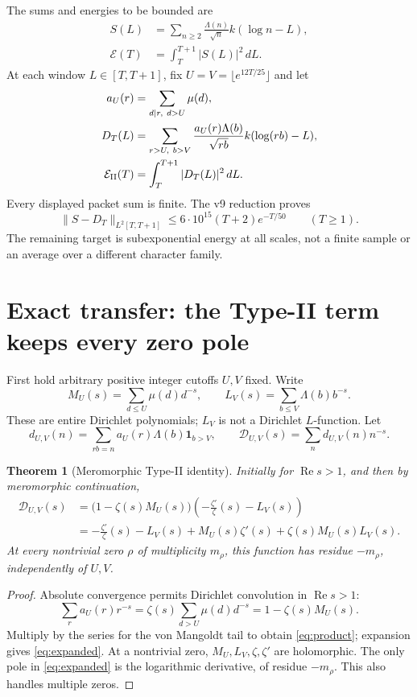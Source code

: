 \documentclass[11pt]{article}
\newtheorem{theorem}{Theorem}
\newcommand{\dd}{\,d}
\newcommand{\Ree}{\operatorname{Re}}
\newcommand{\E}{\mathcal E}
\newcommand{\D}{\mathcal D}
\begin{document}
The sums and energies to be bounded are
\begin{align}
 S(L)&=\sum_{n\ge2}\frac{\Lambda(n)}{\sqrt n}k(\log n-L),\label{eq:S}\\
 \E(T)&=\int_T^{T+1}|S(L)|^2\dd L.\nonumber
\end{align}
At each window $L\in[T,T+1]$, fix $U=V=\lfloor e^{12T/25}\rfloor$ and let
\begin{align}
 a_U(r)&=\sum_{d\mid r,\ d>U}\mu(d),\nonumber\\
 D_T(L)&=\sum_{r>U,\ b>V}\frac{a_U(r)\Lambda(b)}{\sqrt{rb}}
                     k(\log(rb)-L),\label{eq:D}\\
 \E_{\rm II}(T)&=\int_T^{T+1}|D_T(L)|^2\dd L.\nonumber
\end{align}
Every displayed packet sum is finite. The v9 reduction proves
\begin{equation}\label{eq:error}
 \|S-D_T\|_{L^2[T,T+1]}
 \le 6\cdot10^{15}(T+2)e^{-T/50}\qquad(T\ge1).
\end{equation}
The remaining target is subexponential energy at all scales, not a finite
sample or an average over a different character family.

\section{Exact transfer: the Type-II term keeps every zero pole}
First hold arbitrary positive integer cutoffs $U,V$ fixed. Write
\[
 M_U(s)=\sum_{d\le U}\mu(d)d^{-s},\qquad
 L_V(s)=\sum_{b\le V}\Lambda(b)b^{-s}.
\]
These are entire Dirichlet polynomials; $L_V$ is not a Dirichlet
$L$-function. Let
\[
 d_{U,V}(n)=\sum_{rb=n}a_U(r)\Lambda(b)\mathbf1_{b>V},\qquad
 \D_{U,V}(s)=\sum_n d_{U,V}(n)n^{-s}.
\]

\begin{theorem}[Meromorphic Type-II identity]\label{thm:poles}
Initially for $\Ree s>1$, and then by meromorphic continuation,
\begin{align}
 \D_{U,V}(s)
 &=\bigl(1-\zeta(s)M_U(s)\bigr)
       \left(-\frac{\zeta'}{\zeta}(s)-L_V(s)\right)\label{eq:product}\\
 &=-\frac{\zeta'}{\zeta}(s)-L_V(s)
       +M_U(s)\zeta'(s)+\zeta(s)M_U(s)L_V(s).\label{eq:expanded}
\end{align}
At every nontrivial zero $\rho$ of multiplicity $m_\rho$, this function has
residue $-m_\rho$, independently of $U,V$.
\end{theorem}
\begin{proof}
Absolute convergence permits Dirichlet convolution in $\Ree s>1$:
\[
 \sum_r a_U(r)r^{-s}
 =\zeta(s)\sum_{d>U}\mu(d)d^{-s}
 =1-\zeta(s)M_U(s).
\]
Multiply by the series for the von Mangoldt tail to obtain
\eqref{eq:product}; expansion gives \eqref{eq:expanded}.
At a nontrivial zero, $M_U,L_V,\zeta,\zeta'$ are holomorphic. The only pole
in \eqref{eq:expanded} is the logarithmic derivative, of residue
$-m_\rho$. This also handles multiple zeros.
\end{proof}
\end{document}
